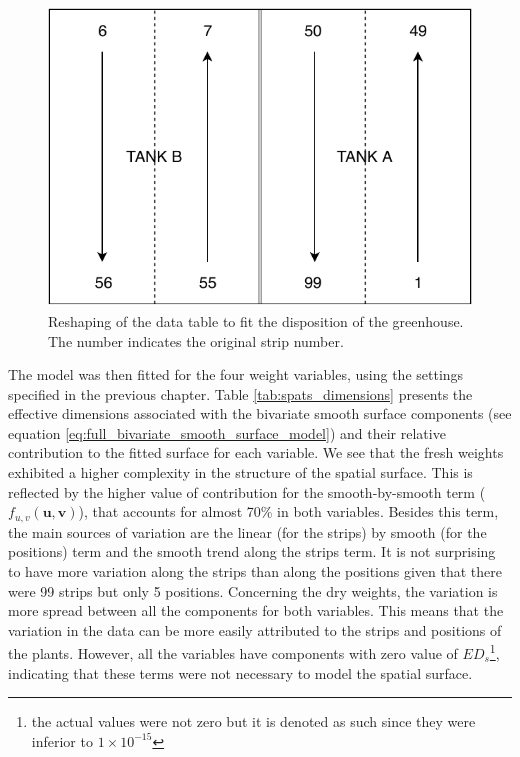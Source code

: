 \begin{figure}[hbtp]
	\centering
	\includegraphics[scale = 0.7]{figures/TANK_repartition.pdf}
	\caption[Reshaping of the data table to fit the disposition of the greenhouse]{Reshaping of the data table to fit the 
	disposition of the greenhouse. The number indicates the original strip number.}
	\label{fig:tank_disposition}	
\end{figure}

The model was then fitted for the four weight variables, using the settings specified in the previous chapter. Table \ref{tab:spats_dimensions} presents the effective dimensions associated with the bivariate smooth surface components (see equation \ref{eq:full_bivariate_smooth_surface_model}) 
and their relative contribution to the fitted surface for each variable.
We see that the fresh weights exhibited a higher complexity in the structure of the spatial surface. This is reflected by the higher value of contribution for the smooth-by-smooth term ($f_{u, v}(\boldsymbol{u}, \boldsymbol{v})$), that accounts for almost 70\% in both variables. Besides this term, the main sources of variation are the linear (for the strips) by smooth (for the positions) term and the smooth trend along the strips term. It is not surprising to have more variation along the strips than along the positions given that there were 99 strips but only 5 positions.
Concerning the dry weights, the variation is more spread between all the components for both variables. This means that the variation in the data can be more easily attributed to the strips and positions of the plants. However, all the variables have components with zero value of $ED_{s}$\footnote{the actual values were not zero but it is denoted as such since they were inferior to $1 \times 10^{-15}$}, indicating that these terms were not necessary to model the spatial surface.\\



